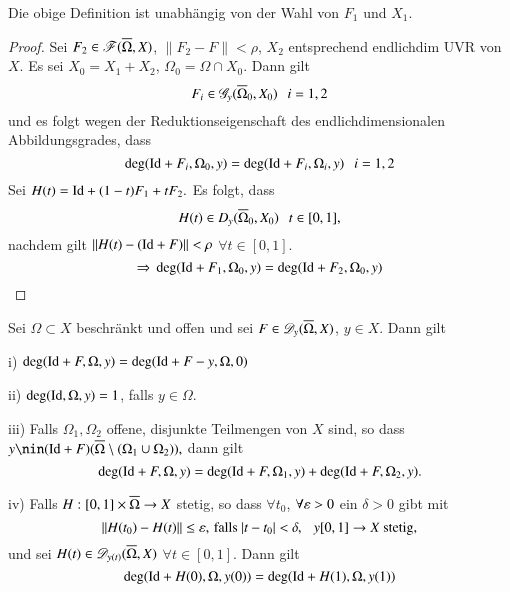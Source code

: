 \begin{prop}\label{3.9}
    Die obige Definition ist unabhängig von der Wahl von $F_1$ und $X_1$.
\end{prop}

\begin{proof}
    Sei $F_2\in \mathscr F (\overline \Omega,X)$, $\|F_2-F\|<\rho$, $X_2$ entsprechend endlichdim UVR von $X$. Es 
    sei $X_0=X_1+X_2$, $\Omega_0=\Omega\cap X_0$. Dann gilt
    \[
        F_i\in \mathscr G_y(\overline\Omega_0,X_0) \hspace{.25cm} i=1,2
    \]
    und es folgt wegen der Reduktionseigenschaft des endlichdimensionalen Abbildungsgrades, dass
    \[
        \deg(\mathrm{Id} + F_i,\Omega_0,y)=\deg(\mathrm{Id}+F_i,\Omega_i,y)\hspace{.25cm} i=1,2
    \]
    Sei $H(t)=\mathrm{Id} + (1-t)F_1+tF_2.$ Es folgt, dass
    \[
        H(t)\in D_y(\overline\Omega_0,X_0) \hspace{.25cm} t\in [0,1],
    \]
    nachdem gilt $\|H(t)-(\mathrm{Id}+F)\|<\rho$ $\forall t\in [0,1]$.
    \[
        \Rightarrow \, \deg(\mathrm{Id}+F_1,\Omega_0,y)=\deg(\mathrm{Id}+F_2,\Omega_0,y)
    \]
\end{proof}

\begin{theorem}\label{3.10}
    Sei $\Omega\subset X$ beschränkt und offen und sei $F\in \mathscr D_y(\overline\Omega,X)$, $y\in X$. Dann gilt
    \begin{description}
        \item{i)}
        $\deg(\mathrm{Id}+F,\Omega,y)=\deg(\mathrm{Id}+F-y,\Omega,0)$
        \item{ii)}
        $\deg(\mathrm{Id}, \Omega,y)=1$, falls $y\in \Omega.$
        \item{iii)}
        Falls $\Omega_1,\Omega_2$ offene, disjunkte Teilmengen von $X$ sind, so dass
        $y\nin (\Id+F)(\ol\Omega\setminus (\Omega_1\cup\Omega_2)),$ dann gilt
        \[
            \deg(\mathrm{Id}+F,\Omega,y)=\deg(\mathrm{Id}+F,\Omega_1,y)+\deg(\mathrm{Id}+F,\Omega_2,y).
        \]
        \item{iv)}
        Falls $H:[0,1]\times\overline\Omega\rightarrow X$ stetig, so dass $\forall t_0$, $\forall\varepsilon>0$ ein
        $\delta>0$ gibt mit
        \[
            \|H(t_0)-H(t)\|\leq \varepsilon, \, \text{falls } |t-t_0|<\delta, \hspace{.25cm} y[0,1]\rightarrow X \text{ stetig,}
        \]
        und sei $H(t)\in \mathscr D _{y(t)}(\overline\Omega,X)$ $\forall t\in[0,1]$. Dann gilt
        \[
            \deg(\mathrm{Id}+H(0),\Omega,y(0))=\deg(\mathrm{Id}+H(1),\Omega,y(1))
        \]
    \end{description}
\end{theorem}

